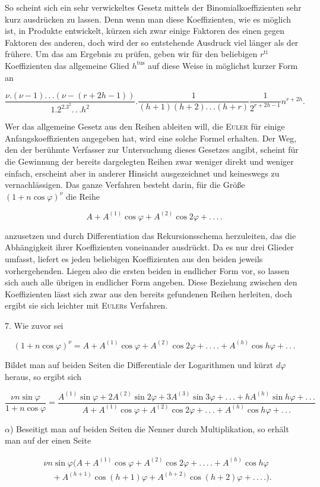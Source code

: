 \par\noindent{}%
\hspace*{\parindent}So scheint sich ein sehr verwickeltes Gesetz mittels der Binomialkoeffizienten sehr kurz ausdrücken zu lassen.
Denn wenn man diese Koeffizienten, wie es möglich ist, in Produkte entwickelt, kürzen sich zwar einige Faktoren des einen gegen Faktoren des anderen, doch wird der so entstehende Ausdruck viel länger als der frühere. Um das am Ergebnis zu prüfen, geben wir für den beliebigen $r^{\text{ti}}$ Koeffizienten das allgemeine Glied $h^{\text{tus}}$ auf diese Weise in möglichst kurzer Form an

\[
\frac{\nu.(\nu-1).\,.\,.(\nu-(r+2h-1))}{1.2^2.3^2.\,.\,. h^2} . \frac{1}{(h+1)(h+2).\,.\,.(h+r)}\frac{1}{2^{r+2h-1}}n^{r+2h}.
\]

Wer das allgemeine Gesetz aus den Reihen ableiten will, die \textsc{Euler} für einige Anfangskoeffizienten angegeben hat, wird eine solche Formel erhalten. Der Weg, den der berühmte Verfasser zur Untersuchung dieses Gesetzes angibt, scheint für die Gewinnung der bereits dargelegten Reihen zwar weniger direkt und weniger einfach, erscheint aber in anderer Hinsicht ausgezeichnet und keineswegs zu vernachlässigen.
Das ganze Verfahren besteht darin, für die Größe $(1+n\cos\varphi)^{\nu}$ die Reihe

\[
A+A^{(1)}\cos\varphi+A^{(2)}\cos2\varphi+.\,.\,.\,.
\]

\noindent anzusetzen und durch Differentiation das Rekursionsschema herzuleiten, das die Abhängigkeit ihrer Koeffizienten voneinander ausdrückt. Da es nur drei Glieder umfasst, liefert es jeden beliebigen Koeffizienten aus den beiden jeweils vorhergehenden. Liegen also die ersten beiden in endlicher Form vor, so lassen sich auch alle übrigen in endlicher Form angeben. Diese Beziehung zwischen den Koeffizienten lässt sich zwar aus den bereits gefundenen Reihen herleiten, doch ergibt sie sich leichter mit \textsc{Euler}s Verfahren.

7. Wie zuvor sei

\[
(1+n\cos\varphi)^{\nu}=A+A^{(1)}\cos\varphi+A^{(2)}\cos2\varphi+.\,.\,.\,.+A^{(h)}\cos h\varphi+.\,.\,.
\]

\noindent Bildet man auf beiden Seiten die Differentiale der Logarithmen und kürzt $d\varphi$ heraus, so ergibt sich

\[
\frac{\nu n\sin\varphi}{1+n\cos\varphi}=\frac{A^{(1)}\sin\varphi+2A^{(2)}\sin2\varphi+3A^{(3)}\sin3\varphi+.\,.\,.+hA^{(h)}\sin h\varphi+.\,.\,.}{A+A^{(1)}\cos\varphi+A^{(2)}\cos2\varphi+.\,.\,.+A^{(h)}\cos h\varphi+.\,.\,.}
\]

$\alpha$) Beseitigt man auf beiden Seiten die Nenner durch Multiplikation, so erhält man auf der einen Seite

\[
\begin{aligned}
&\nu n\sin\varphi\bigl(A+A^{(1)}\cos\varphi+A^{(2)}\cos2\varphi+.\,.\,.\,.+A^{(h)}\cos h\varphi\\&\quad+A^{(h+1)}\cos(h+1)\varphi+A^{(h+2)}\cos(h+2)\varphi+.\,.\,.\,.\bigr).
\end{aligned}
\]

